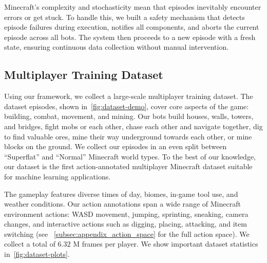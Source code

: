 Minecraft's complexity and stochasticity mean that episodes inevitably encounter errors or get stuck. To handle this, we built a safety mechanism that detects episode failures during execution, notifies all components, and aborts the current episode across all bots. The system then proceeds to a new episode with a fresh state, ensuring continuous data collection without manual intervention.














\subsection{Multiplayer Training Dataset}

Using our framework, we collect a large-scale multiplayer training dataset. The dataset episodes, shown in~\cref{fig:dataset-demo}, cover core aspects of the game: building, combat, movement, and mining. Our bots build houses, walls, towers, and bridges, fight mobs or each other, chase each other and navigate together, dig to find valuable ores, mine their way underground towards each other, or mine blocks on the ground. We collect our episodes in an even split between ``Superflat'' and ``Normal'' Minecraft world types. To the best of our knowledge, our dataset is the first action-annotated multiplayer Minecraft dataset suitable for machine learning applications.

The gameplay features diverse times of day, biomes, in-game tool use, and weather conditions. Our action annotations span a wide range of Minecraft environment actions: WASD movement, jumping, sprinting, sneaking, camera changes, and interactive actions such as digging, placing, attacking, and item switching (see ~\cref{subsec:appendix_action_space} for the full action space). We collect a total of $6.32$ M frames per player. We show important dataset statistics in~\cref{fig:dataset-plots}.

